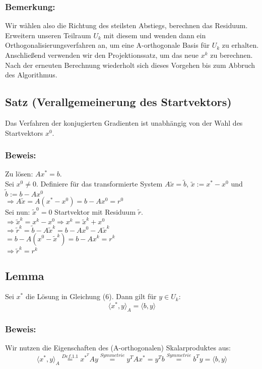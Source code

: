 \documentclass{article}
\begin{document}
\subsubsection{Bemerkung:}
Wir wählen also die Richtung des steilsten Abstiegs, berechnen das Residuum. Erweitern unseren Teilraum $U_{k}$ mit diesem und wenden dann ein Orthogonalisierungsverfahren an, um eine A-orthogonale Basis für $U_{k}$ zu erhalten. Anschließend verwenden wir den Projektionssatz, um das neue $x^{k}$ zu berechnen. Nach der erneuten Berechnung wiederholt sich dieses Vorgehen bis zum Abbruch des Algorithmus.

\subsection{Satz (Verallgemeinerung des Startvektors)}
Das Verfahren der konjugierten Gradienten ist unabhängig von der Wahl des Startvektors $x^{0}$.

\subsubsection{Beweis:}
Zu lösen: $Ax^{*} = b$.
\\Sei $x^{0} \ne 0$. Definiere für das transformierte System $A\tilde x = \tilde b$, $\tilde x := x^{*} - x^{0}$ und $\tilde b := b - Ax^{0}$
\\$\Longrightarrow A\tilde x = A(x^{*} - x^{0}) = b - Ax^{0} = r^{0}$
\\Sei nun: $\tilde x^{0} = 0$ Startvektor mit Residuum $\tilde r$.
\\$\Longrightarrow \tilde x^{k} = x^{k} - x^{0} \Longrightarrow x^{k} = \tilde x^{k} + x^{0}$
\\$\Longrightarrow \tilde r^{k} = \tilde b - A\tilde x^{k} = b - Ax^{0} - A\tilde x^{k}$
\\$= b - A(x^{0} - \tilde x^{k}) = b - Ax^{k} = r^{k}$
\\$\Longrightarrow \tilde r^{k} = r^{k}$

\subsection{Lemma}
Sei $x^{*}$ die Lösung in Gleichung (6). Dann gilt für $y \in U_{k}$:
\begin{equation}
\langle x^{*}, y \rangle _{A} = \langle b, y \rangle
\end{equation}

\subsubsection{Beweis:}
Wir nutzen die Eigenschaften des (A-orthogonalen) Skalarproduktes aus:
\begin{equation*}
\langle x^{*}, y \rangle _{A} \overset{Def. 1.1}{=} x^{{*}^{T}}Ay \overset{Symmetrie}{=} y^{T}Ax^{*} = y^{T}b \overset{Symmetrie}{=} b^{T}y = \langle b, y \rangle
\end{equation*}
\end{document}
